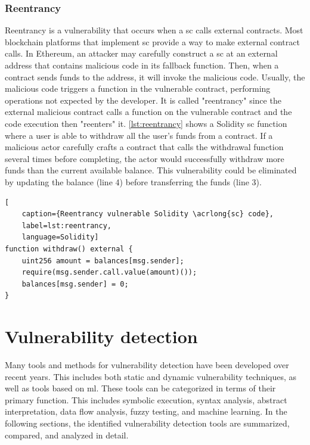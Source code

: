 \subsubsection{Reentrancy}
Reentrancy is a vulnerability that occurs when a \acrshort{sc} calls external contracts. Most blockchain platforms that implement \acrshort{sc} provide a way to make external contract calls. In Ethereum, an attacker may carefully construct a \acrshort{sc} at an external address that contains malicious code in its fallback function. Then, when a contract sends funds to the address, it will invoke the malicious code. Usually, the malicious code triggers a function in the vulnerable contract, performing operations not expected by the developer. It is called "reentrancy" since the external malicious contract calls a function on the vulnerable contract and the code execution then "reenters" it. \cref{lst:reentrancy} shows a Solidity \acrshort{sc} function where a user is able to withdraw all the user's funds from a contract. If a malicious actor carefully crafts a contract that calls the withdrawal function several times before completing, the actor would successfully withdraw more funds than the current available balance. This vulnerability could be eliminated by updating the balance (line 4) before transferring the funds (line 3).

\begin{lstlisting}[
    caption={Reentrancy vulnerable Solidity \acrlong{sc} code},
    label=lst:reentrancy,
    language=Solidity]
function withdraw() external {
    uint256 amount = balances[msg.sender];
    require(msg.sender.call.value(amount)());
    balances[msg.sender] = 0;
}   
\end{lstlisting}


\section{Vulnerability detection}
\label{sec:vulnerability-detection}
Many tools and methods for vulnerability detection have been developed over recent years. This includes both static and dynamic vulnerability techniques, as well as tools based on \acrfull{ml}. These tools can be categorized in terms of their primary function. This includes symbolic execution, syntax analysis, abstract interpretation, data flow analysis, fuzzy testing, and machine learning. In the following sections, the identified vulnerability detection tools are summarized, compared, and analyzed in detail.

